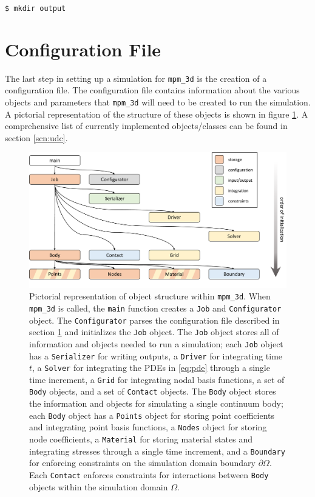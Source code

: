 \texttt{\$ mkdir output}


\section{Configuration File} \label{scn:config_file}
The last step in setting up a simulation for \texttt{mpm\_3d} is the creation of a configuration file. The configuration file contains information about the various objects and parameters that \texttt{mpm\_3d} will need to be created to run the simulation. A pictorial representation of the structure of these objects is shown in figure \ref{fig:code}. A comprehensive list of currently implemented objects/classes can be found in section \ref{scn:udc}.

\begin{figure}[!ht]
\centering
\includegraphics[scale=0.5]{images/CodeDiagram.pdf}
\caption{Pictorial representation of object structure within \texttt{mpm\_3d}. When \texttt{mpm\_3d} is called, the \texttt{main} function creates a \texttt{Job} and \texttt{Configurator} object. The \texttt{Configurator} parses the configuration file described in section \ref{scn:config_file} and initializes the \texttt{Job} object. The \texttt{Job} object stores all of information and objects needed to run a simulation; each \texttt{Job} object has a \texttt{Serializer} for writing outputs, a \texttt{Driver} for integrating time $t$, a \texttt{Solver} for integrating the PDEs in \eqref{eq:pde} through a single time increment, a \texttt{Grid} for integrating nodal basis functions, a set of \texttt{Body} objects, and a set of \texttt{Contact} objects. The \texttt{Body} object stores the information and objects for simulating a single continuum body; each \texttt{Body} object has a \texttt{Points} object for storing point coefficients and integrating point basis functions, a \texttt{Nodes} object for storing node coefficients, a \texttt{Material} for storing material states and integrating stresses through a single time increment, and a \texttt{Boundary} for enforcing constraints on the simulation domain boundary $\partial \Omega$. Each \texttt{Contact} enforces constraints for interactions between \texttt{Body} objects within the simulation domain $\Omega$.} \label{fig:code}
\end{figure}

